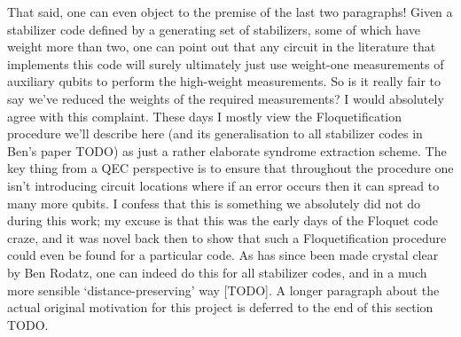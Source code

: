 That said, one can even object to the premise of the last two paragraphs!
Given a stabilizer code defined by a generating set of stabilizers, some of which have weight more than two, one can point out that any circuit in the literature that implements this code will surely ultimately just use weight-one measurements of auxiliary qubits to perform the high-weight measurements.
So is it really fair to say we've reduced the weights of the required measurements?
I would absolutely agree with this complaint.
These days I mostly view the Floquetification procedure we'll describe here (and its generalisation to all stabilizer codes in Ben's paper TODO) as just a rather elaborate syndrome extraction scheme.
The key thing from a QEC perspective is to ensure that throughout the procedure one isn't introducing circuit locations where if an error occurs then it can spread to many more qubits.
I confess that this is something we absolutely did not do during this work; my excuse is that this was the early days of the Floquet code craze, and it was novel back then to show that such a Floquetification procedure could even be found for a particular code.
As has since been made crystal clear by Ben Rodatz, one can indeed do this for all stabilizer codes, and in a much more sensible `distance-preserving' way [TODO].
A longer paragraph about the actual original motivation for this project is deferred to the end of this section TODO.



